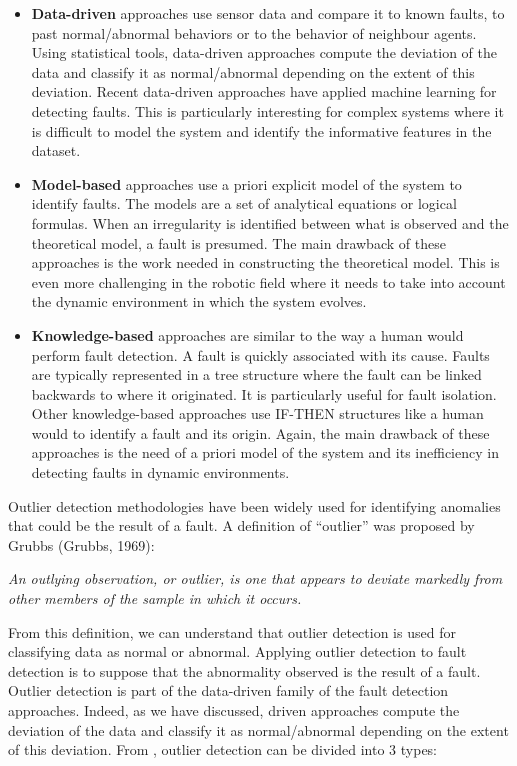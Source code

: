 \begin{itemize}
\item \textbf{Data-driven} approaches use sensor data and compare it to known faults, to past normal/abnormal behaviors or to the behavior of neighbour agents. Using statistical tools, data-driven approaches compute the deviation of the data and classify it as normal/abnormal depending on the extent of this deviation.  Recent data-driven approaches have applied machine learning for detecting faults. This is particularly interesting for complex systems where it is difficult to model the system and identify the informative features in the dataset.
\item \textbf{Model-based} approaches use a priori explicit model of the system to identify faults. The models are a set of analytical equations or logical formulas. When an irregularity is identified between what is observed and the theoretical model, a fault is presumed. The main drawback of these approaches is the work needed in constructing the theoretical model. This is even more challenging in the robotic field where it needs to take into account the dynamic environment in which the system evolves. 
\item \textbf{Knowledge-based} approaches are similar to the way a human would perform fault detection. A fault is quickly associated with its cause. Faults are typically represented in a tree structure where the fault can be linked backwards to where it originated. It is particularly useful for fault isolation. Other knowledge-based approaches use IF-THEN structures like a human would to identify a fault and its origin. Again, the main drawback of these approaches is the need of a priori model of the system and its inefficiency in detecting faults in dynamic environments.
\end{itemize}


Outlier detection methodologies have been widely used for identifying anomalies that could be the result of a fault. A definition of “outlier” was proposed by Grubbs (Grubbs, 1969): 

\begin{center}
\textit{An outlying observation, or outlier, is one that appears to deviate
markedly from other members of the sample in which it occurs.}
\end{center} 

From this definition, we can understand that outlier detection is used for classifying data as normal or abnormal. Applying outlier detection to fault detection is to suppose that the abnormality observed is the result of a fault. Outlier detection is part of the data-driven family of the fault detection approaches.  Indeed, as we have discussed, driven approaches compute the deviation of the data and classify it as normal/abnormal depending on the extent of this deviation. From \cite{hodge2004survey}, outlier detection can be divided into 3 types: 

